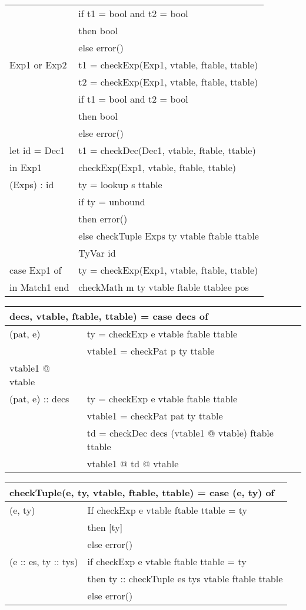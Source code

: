 \documentclass [10pt,a4paper]{article}
\begin{document}
\begin{tabular}{|l|l|}
  & if t1 = bool and t2 = bool \\
  & then bool \\
  & else error() \\ \hline
  Exp1 or Exp2 & t1 = checkExp(Exp1, vtable, ftable, ttable) \\
  & t2 = checkExp(Exp1, vtable, ftable, ttable) \\ 
  & if t1 = bool and t2 = bool \\
  & then bool \\
  & else error() \\ \hline
  let id = Dec1 & t1 = checkDec(Dec1, vtable, ftable, ttable) \\
  in Exp1 & checkExp(Exp1, vtable, ftable, ttable) \\ \hline
  (Exps) : id & ty = lookup s ttable \\
  & if ty = unbound \\
  & then error() \\
  & else checkTuple Exps ty vtable ftable ttable \\
  & TyVar id \\ \hline
  case Exp1 of & ty = checkExp(Exp1, vtable, ftable, ttable) \\
  in Match1 end & checkMath m ty vtable ftable ttablee pos \\ \hline
\end{tabular}

\begin{tabular}{|l|l|}
  \hline
  \multicolumn{2}{|l|}{decs, vtable, ftable, ttable) = case
    decs of} \\ \hline
  (pat, e) & ty = checkExp e vtable ftable ttable \\
  & vtable1 = checkPat p ty ttable \\
  vtable1 @ vtable \\ \hline
  (pat, e) :: decs & ty = checkExp e vtable ftable ttable \\
  & vtable1 = checkPat pat ty ttable \\
  & td = checkDec decs (vtable1 @ vtable) ftable ttable \\
  & vtable1 @ td @ vtable \\ \hline
\end{tabular}

\begin{tabular}{|l|l|}
  \hline
  \multicolumn{2}{|l|}{checkTuple(e, ty, vtable, ftable, ttable) = case (e, ty) of} \\ \hline
  	(e, ty) & If checkExp e vtable ftable ttable = ty \\
            & then [ty] \\
        	& else error() \\ 
			\hline
	(e :: es, ty :: tys) & if checkExp e vtable ftable ttable  = ty \\
			        	 & then ty :: checkTuple es tys vtable ftable ttable \\
			             & else error() \\ \hline
\end{tabular}
\end{document}
